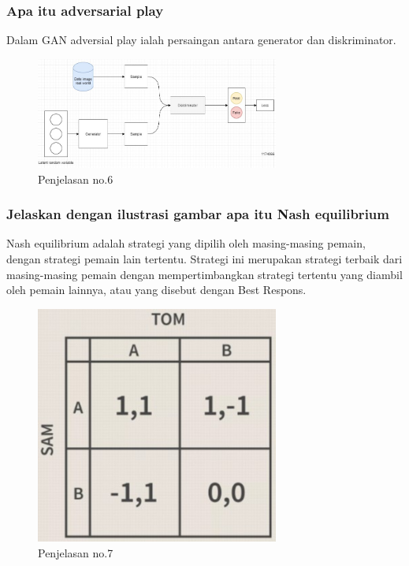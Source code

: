 \subsubsection{Apa itu adversarial play}
\hfill\break
Dalam GAN adversial play ialah persaingan antara generator dan diskriminator.
\begin{figure}[H]
	\centering
	\includegraphics[width=8cm]{figures/1174067/8/6.jpg}
	\caption{Penjelasan no.6}
\end{figure}

\subsubsection{Jelaskan dengan ilustrasi gambar apa itu Nash equilibrium}
\hfill\break
Nash equilibrium adalah strategi yang dipilih oleh masing-masing pemain, dengan strategi pemain lain tertentu.  Strategi ini merupakan strategi terbaik dari masing-masing pemain dengan mempertimbangkan strategi tertentu yang diambil oleh pemain lainnya, atau yang disebut dengan Best Respons.
\begin{figure}[H]
	\centering
	\includegraphics[width=8cm]{figures/1174067/8/7.jpg}
	\caption{Penjelasan no.7}
\end{figure}

